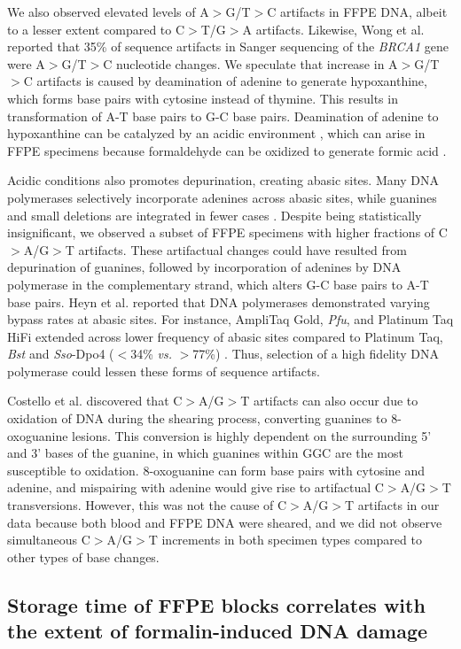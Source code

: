 We also observed elevated levels of A$>$G/T$>$C artifacts in FFPE DNA, albeit to a lesser extent compared to C$>$T/G$>$A artifacts. Likewise, Wong et al. \cite{Wong1998} reported that 35\% of sequence artifacts in Sanger sequencing of the \textit{BRCA1} gene were A$>$G/T$>$C nucleotide changes. We speculate that increase in A$>$G/T$>$C artifacts is caused by deamination of adenine to generate hypoxanthine, which forms base pairs with cytosine instead of thymine. This results in transformation of A-T base pairs to G-C base pairs. Deamination of adenine to hypoxanthine can be catalyzed by an acidic environment \cite{Wang2010}, which can arise in FFPE specimens because formaldehyde can be oxidized to generate formic acid \cite{Do2015a}.

Acidic conditions also promotes depurination, creating abasic sites. Many DNA polymerases selectively incorporate adenines across abasic sites, while guanines and small deletions are integrated in fewer cases \cite{Heyn2010}. Despite being statistically insignificant, we observed a subset of FFPE specimens with higher fractions of C$>$A/G$>$T artifacts. These artifactual changes could have resulted from depurination of guanines, followed by incorporation of adenines by DNA polymerase in the complementary strand, which alters G-C base pairs to A-T base pairs. Heyn et al. \cite{Heyn2010} reported that DNA polymerases demonstrated varying bypass rates at abasic sites. For instance, AmpliTaq Gold, \textit{Pfu}, and Platinum Taq HiFi extended across lower frequency of abasic sites compared to Platinum Taq, \textit{Bst} and \textit{Sso}-Dpo4 ($<$34\% \textit{vs.} $>$77\%) \cite{Heyn2010}. Thus, selection of a high fidelity DNA polymerase could lessen these forms of sequence artifacts.

Costello et al. \cite{Costello2013} discovered that C$>$A/G$>$T artifacts can also occur due to oxidation of DNA during the shearing process, converting guanines to 8-oxoguanine lesions. This conversion is highly dependent on the surrounding 5' and 3' bases of the guanine, in which guanines within GGC are the most susceptible to oxidation. 8-oxoguanine can form base pairs with cytosine and adenine, and mispairing with adenine would give rise to artifactual C$>$A/G$>$T transversions. However, this was not the cause of C$>$A/G$>$T artifacts in our data because both blood and FFPE DNA were sheared, and we did not observe simultaneous C$>$A/G$>$T increments in both specimen types compared to other types of base changes.

\subsection{Storage time of FFPE blocks correlates with the extent of formalin-induced DNA damage}

